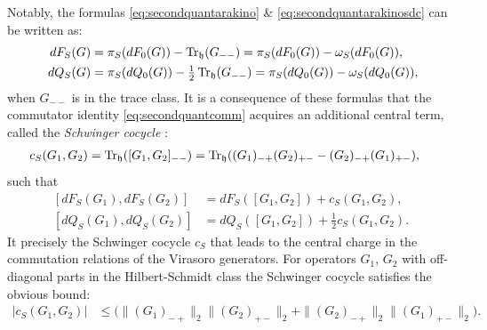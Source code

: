 \documentclass[a4paper, 11pt]{article}
\newcommand{\fh}{\mathfrak{h}}
\DeclareMathOperator{\1}{\mathds{1}}
\begin{document}
Notably, the formulas \eqref{eq:secondquantarakino} \& \eqref{eq:secondquantarakinosdc} can be written as:
\begin{align}
\label{eq;vacexpren}
dF_{S}(G) & = \pi_{S}(dF_{0}(G)) - \Tr_{\fh}(G_{--}) = \pi_{S}(dF_{0}(G)) - \omega_{S}(dF_{0}(G)), \\ \nonumber
dQ_{S}(G) & = \pi_{S}(dQ_{0}(G)) - \tfrac{1}{2}\Tr_{\fh}(G_{--}) = \pi_{S}(dQ_{0}(G)) - \omega_{S}(dQ_{0}(G)),
\end{align}
when $G_{--}$ is in the trace class. It is a consequence of these formulas that the commutator identity \eqref{eq:secondquantcomm} acquires an additional central term, called the \textit{Schwinger cocycle} \cite{LundbergQuasiFreeSecond}:
\begin{align}
\label{eq:schwinger}
c_{S}(G_{1},G_{2}) & = \Tr_{\fh}([G_{1},G_{2}]_{--}) = \Tr_{\fh}((G_{1})_{-+}(G_{2})_{+-}-(G_{2})_{-+}(G_{1})_{+-}),
\end{align}
such that
\begin{align}
\label{secondquantcommno}
[dF_{S}(G_{1}),dF_{S}(G_{2})] & = dF_{S}([G_{1},G_{2}]) + c_{S}(G_{1},G_{2}), \\ \nonumber
[dQ_{S}(G_{1}),dQ_{S}(G_{2})] & = dQ_{S}([G_{1},G_{2}]) + \tfrac{1}{2}c_{S}(G_{1},G_{2}).
\end{align}
It precisely the Schwinger cocycle $c_{S}$ that leads to the central charge in the commutation relations of the Virasoro generators. For operators $G_{1}$, $G_{2}$ with off-diagonal parts in the Hilbert-Schmidt class the Schwinger cocycle satisfies the obvious bound:
\begin{align}
\label{eq:schwingerbound}
|c_{S}(G_{1},G_{2})| & \leq \big(\|(G_{1})_{-+}\|_{2}\|(G_{2})_{+-}\|_{2}+\|(G_{2})_{-+}\|_{2}\|(G_{1})_{+-}\|_{2}\big).
\end{align}
\end{document}
